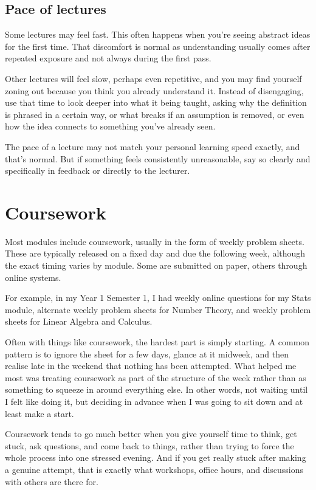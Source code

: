 \subsection{Pace of lectures}

Some lectures may feel fast. This often happens when you’re seeing abstract ideas for the first time. That discomfort is normal as understanding usually comes after repeated exposure and not always during the first pass.

Other lectures will feel slow, perhaps even repetitive, and you may find yourself zoning out because you think you already understand it. Instead of disengaging, use that time to look deeper into what it being taught, asking why the definition is phrased in a certain way, or what breaks if an assumption is removed, or even how the idea connects to something you've already seen. 

The pace of a lecture may not match your personal learning speed exactly, and that's normal. But if something feels consistently unreasonable, say so clearly and specifically in feedback or directly to the lecturer.


\section{Coursework}
Most modules include coursework, usually in the form of weekly problem sheets. These are typically released on a fixed day and due the following week, although the exact timing varies by module. Some are submitted on paper, others through online systems.

For example, in my Year 1 Semester 1, I had weekly online questions for my Stats module, alternate weekly problem sheets for Number Theory, and weekly problem sheets for Linear Algebra and Calculus. 

Often with things like coursework, the hardest part is simply starting. A common pattern is to ignore the sheet for a few days, glance at it midweek, and then realise late in the weekend that nothing has been attempted. What helped me most was treating coursework as part of the structure of the week rather than as something to squeeze in around everything else. In other words, not waiting until I felt like doing it, but deciding in advance when I was going to sit down and at least make a start.

Coursework tends to go much better when you give yourself time to think, get stuck, ask questions, and come back to things, rather than trying to force the whole process into one stressed evening. And if you get really stuck after making a genuine attempt, that is exactly what workshops, office hours, and discussions with others are there for.


